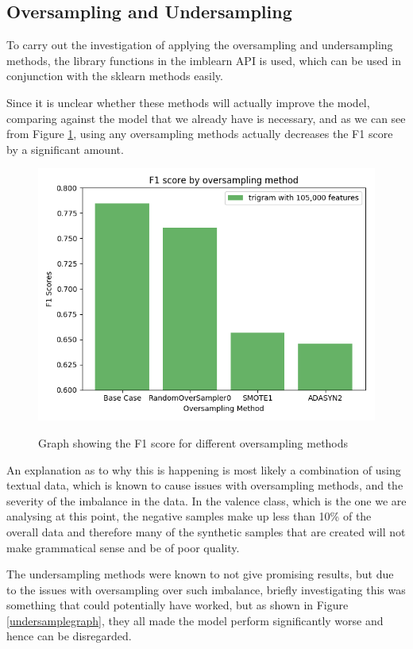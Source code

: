 \subsection{Oversampling and Undersampling}

To carry out the investigation of applying the oversampling and undersampling methods, the library functions in the imblearn API is used, which can be used in conjunction with the sklearn methods easily. 

Since it is unclear whether these methods will actually improve the model, comparing against the model that we already have is necessary, and as we can see from Figure \ref{oversamplegraph}, using any oversampling methods actually decreases the F1 score by a significant amount. 


\begin{figure}[ht]
\caption{Graph showing the F1 score for different oversampling methods}
\centering
\includegraphics[scale=0.7]{graphs/oversampling.png}
\label{oversamplegraph}
\end{figure}

An explanation as to why this is happening is most likely a combination of using textual data, which is known to cause issues with oversampling methods, and the severity of the imbalance in the data. In the valence class, which is the one we are analysing at this point, the negative samples make up less than 10\% of the overall data and therefore many of the synthetic samples that are created will not make grammatical sense and be of poor quality. 


The undersampling methods were known to not give promising results, but due to the issues with oversampling over such imbalance, briefly investigating this was something that could potentially have worked, but as shown in Figure \ref{undersamplegraph}, they all made the model perform significantly worse and hence can be disregarded.

